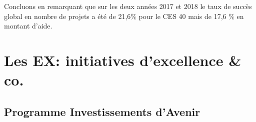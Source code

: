 Concluons en remarquant que sur les deux ann\'ees 2017 et 2018 le taux de succ\`es global en nombre de projets a \'et\'e de 21,6\% pour le CES 40 mais de 17,6 \% en montant d'aide.


\section{Les EX: \og initiatives d'excellence\fg{} \& co.}\label{trucenex}

\subsection{Programme Investissements d'Avenir}

